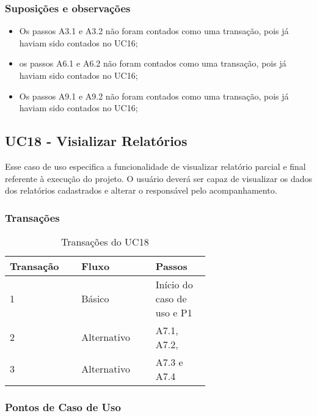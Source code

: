  \subsubsection{Suposições e observações}
  
  \begin{itemize}
   \item Os passos A3.1 e A3.2 não foram contados como uma transação, pois já haviam sido contados no UC16;	
   \item os passos A6.1 e A6.2 não foram contados como uma transação, pois já haviam sido contados no UC16;	
   \item Os passos A9.1 e A9.2 não foram contados como uma transação, pois já haviam sido contados no UC16;
  \end{itemize}
  
  \vfill
  
  
  
  \pagebreak
\subsection{UC18 - Visializar Relatórios}
  
  Esse caso de uso especifica a funcionalidade de visualizar relatório parcial e final referente à execução do projeto.
  O usuário deverá ser capaz de visualizar os dados dos relatórios cadastrados e alterar o responsável pelo acompanhamento.

  \subsubsection{Transações}

  \begin{table*}[!h]
  \centering
  \caption{Transações do UC18}
  \label{uc17_transactions}
    \begin{tabular}{|p{0.20\linewidth}|p{0.25\linewidth}|p{0.20\linewidth}|}
    \hline
    \textbf{Transação} & \textbf{Fluxo} & \textbf{Passos} \\ 
    \hline
    1 & Básico & Início do caso de uso e P1\\
    \hline
    2 & Alternativo & A7.1, A7.2, \\
    \hline
    3 & Alternativo & A7.3 e A7.4\\
    \hline
    \end{tabular}
  \end{table*}

  \subsubsection{Pontos de Caso de Uso}

